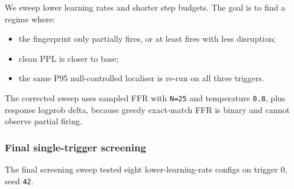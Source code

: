 \documentclass[
  11pt,
  a4paper,
]{article}
\providecommand{\tightlist}{%
  \setlength{\itemsep}{0pt}\setlength{\parskip}{0pt}}
\begin{document}
We sweep lower learning rates and shorter step budgets. The goal is to
find a regime where:

\begin{itemize}
\tightlist
\item
  the fingerprint only partially fires, or at least fires with less
  disruption;
\item
  clean PPL is closer to base;
\item
  the same P95 null-controlled localiser is re-run on all three
  triggers.
\end{itemize}

The corrected sweep uses sampled FFR with \texttt{N=25} and temperature
\texttt{0.8}, plus response logprob delta, because greedy exact-match
FFR is binary and cannot observe partial firing.

\subsubsection{Final single-trigger
screening}\label{final-single-trigger-screening}

The final screening sweep tested eight lower-learning-rate configs on
trigger 0, seed \texttt{42}.
\end{document}
